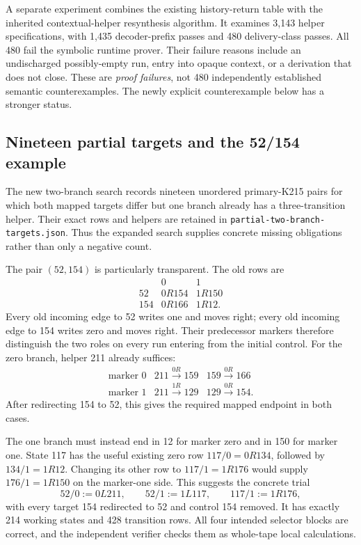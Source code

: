 A separate experiment combines the existing history-return table with the inherited contextual-helper resynthesis algorithm. It examines 3,143 helper specifications, with 1,435 decoder-prefix passes and 480 delivery-class passes. All 480 fail the symbolic runtime prover. Their failure reasons include an undischarged possibly-empty run, entry into opaque context, or a derivation that does not close. These are \emph{proof failures}, not 480 independently established semantic counterexamples. The newly explicit counterexample below has a stronger status.

\subsection{Nineteen partial targets and the 52/154 example}

The new two-branch search records nineteen unordered primary-K215 pairs for which both mapped targets differ but one branch already has a three-transition helper. Their exact rows and helpers are retained in \texttt{partial-two-branch-targets.json}. Thus the expanded search supplies concrete missing obligations rather than only a negative count.

The pair $(52,154)$ is particularly transparent. The old rows are
\[
\begin{array}{c|cc}
 &0&1\\\hline
52&0R154&1R150\\
154&0R166&1R12.
\end{array}
\]
Every old incoming edge to 52 writes one and moves right; every old incoming edge to 154 writes zero and moves right. Their predecessor markers therefore distinguish the two roles on every run entering from the initial control. For the zero branch, helper 211 already suffices:
\[
\begin{array}{c|cc}
\text{marker }0&211\xrightarrow{0R}159&159\xrightarrow{0R}166\\
\text{marker }1&211\xrightarrow{1R}129&129\xrightarrow{0R}154.
\end{array}
\]
After redirecting 154 to 52, this gives the required mapped endpoint in both cases.

The one branch must instead end in 12 for marker zero and in 150 for marker one. State 117 has the useful existing zero row $117/0=0R134$, followed by $134/1=1R12$. Changing its other row to $117/1=1R176$ would supply $176/1=1R150$ on the marker-one side. This suggests the concrete trial
\[
 52/0:=0L211,\qquad
 52/1:=1L117,\qquad
 117/1:=1R176,
\]
with every target 154 redirected to 52 and control 154 removed. It has exactly 214 working states and 428 transition rows. All four intended selector blocks are correct, and the independent verifier checks them as whole-tape local calculations.

